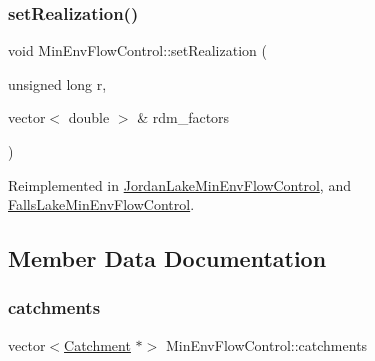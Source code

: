 \mbox{\label{classMinEnvFlowControl_aff9774bd700410f9cd9a04e323f824c8}} 
\subsubsection{\texorpdfstring{set\+Realization()}{setRealization()}}
{\footnotesize\ttfamily void Min\+Env\+Flow\+Control\+::set\+Realization (\begin{DoxyParamCaption}\item[{unsigned long}]{r,  }\item[{vector$<$ double $>$ \&}]{rdm\+\_\+factors }\end{DoxyParamCaption})\hspace{0.3cm}{\ttfamily [virtual]}}



Reimplemented in \mbox{\hyperlink{classJordanLakeMinEnvFlowControl_aa1e816121060212f3dbeffda90a7baec}{Jordan\+Lake\+Min\+Env\+Flow\+Control}}, and \mbox{\hyperlink{classFallsLakeMinEnvFlowControl_a6ea8a5e9ff9179066cceb77d896f3f97}{Falls\+Lake\+Min\+Env\+Flow\+Control}}.



\subsection{Member Data Documentation}
\mbox{\label{classMinEnvFlowControl_a99502573f30daf84d9ad7a2f62197b77}} 
\subsubsection{\texorpdfstring{catchments}{catchments}}
{\footnotesize\ttfamily vector$<$\mbox{\hyperlink{classCatchment}{Catchment}} $\ast$$>$ Min\+Env\+Flow\+Control\+::catchments\hspace{0.3cm}{\ttfamily [protected]}}

\mbox{\label{classMinEnvFlowControl_abc3f168cd1ec36ba59e4b8604dfae8ec}} 
